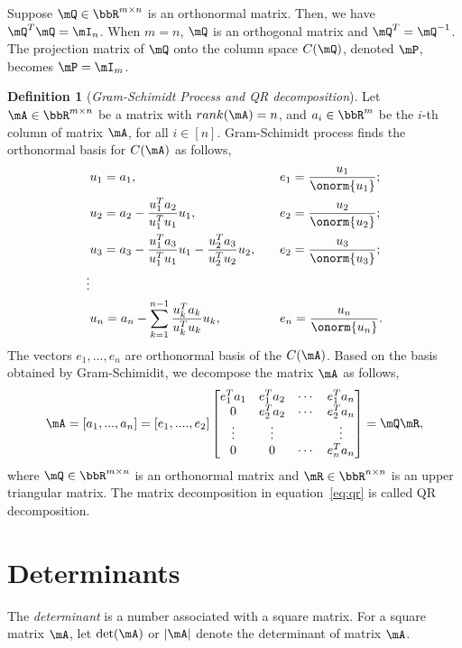 \documentclass[11pt]{article}
\theoremstyle{plain}
\theoremstyle{definition}
\newtheorem{defn}{Definition}
\begin{document}
Suppose $\mQ \in \bbR^{m \times n}$ is an orthonormal matrix. Then, we have $\mQ^T \mQ = \mI_n$.  When $m = n$, $\mQ$ is an orthogonal matrix and $\mQ^T = \mQ^{-1}$. The projection matrix of $\mQ$ onto the column space $C(\mQ)$, denoted $\mP$,  becomes $\mP = \mI_m$.

\begin{defn}[\textit{Gram-Schimidt Process and QR decomposition}]\label{gram-schimidt}
Let $\mA \in \bbR^{m \times n}$ be a matrix with $rank(\mA) = n$, and  $a_i \in \bbR^{m}$ be the $i$-th column of matrix $\mA$, for all $i \in [n]$. Gram-Schimidt process finds the orthonormal basis for $C(\mA)$ as follows,
\begin{align}
	&u_1 = a_1, &&\quad e_1 = \frac{u_1}{\onorm{u_1}};\\
	&u_2 = a_2 - \frac{u_1^T a_2}{u_1^T u_1} u_1 ,&&\quad  e_2 = \frac{u_2}{\onorm{u_2}};\\
	&u_3 = a_3 - \frac{u_1^T a_3}{u_1^T u_1} u_1 - \frac{u_2^T a_3}{u_2^T u_2} u_2,&&\quad  e_2 = \frac{u_3}{\onorm{u_3}};\\
	\vdots\\
	&u_n = a_n - \sum_{k = 1}^{n-1} \frac{u_k^T a_k}{u_k^T u_k} u_k, && \quad e_n = \frac{u_n}{\onorm{u_n}}.
\end{align}
 The vectors $e_1,...,e_n$ are orthonormal basis of the $C(\mA)$. Based on the basis obtained by Gram-Schimidit, we decompose the matrix $\mA$ as follows,
 \begin{equation}\label{eq:qr}
 	\mA = [a_1,...,a_n] = [e_1,....,e_2] \begin{bmatrix}
 		e_1^T a_1 & e_1^T a_2 & \cdots & e_1^T a_n\\
 		0&e_2^T a_2 & \cdots & e_2^T a_n\\
 		\vdots &\vdots & & \vdots \\
 		0 &0&\cdots & e_n^T a_n
 	\end{bmatrix} = \mQ \mR,
 \end{equation}
	where $\mQ \in \bbR^{m \times n}$ is an orthonormal matrix and $\mR \in \bbR^{n \times n}$ is an upper triangular matrix. The matrix decomposition in equation~\eqref{eq:qr} is called QR decomposition.
\end{defn}

\section{Determinants}
The \textit{determinant} is a number associated with a square matrix. For a square matrix $\mA$, let $\det(\mA)$ or $|\mA|$ denote the determinant of matrix $\mA$.
\end{document}
